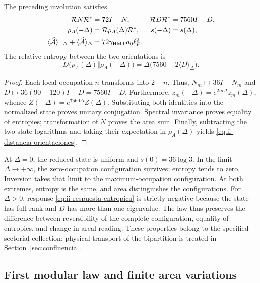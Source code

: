 \begin{theorem}
The preceding involution satisfies
\begin{align}
 \mathcal R N\mathcal R^*&=72I-N,&
 \mathcal R D\mathcal R^*&=7560I-D,\\
 \rho_A(-\Delta)&=\mathcal R\rho_A(\Delta)\mathcal R^*,&
 s(-\Delta)&=s(\Delta),
 \label{eq:ii-inversion-entropia}\\
 \langle\widehat{\mathcal A}\rangle_{-\Delta}
 +\langle\widehat{\mathcal A}\rangle_\Delta
 &=72\gamma_{\mathrm{HMT}}a_0\ell_P^2.&&
 \label{eq:ii-area-complementaria}
\end{align}
The relative entropy between the two orientations is
\begin{equation}
 D\bigl(\rho_A(\Delta)\Vert\rho_A(-\Delta)\bigr)
 =\Delta\bigl(7560-2\langle D\rangle_\Delta\bigr).
 \label{eq:ii-distancia-orientaciones}
\end{equation}
\end{theorem}
\begin{proof}
Each local occupation $n$ transforms into $2-n$. Thus,
$N_m\mapsto36I-N_m$ and
$D\mapsto36(90+120)I-D=7560I-D$.
Furthermore, $z_m(-\Delta)=e^{2m\Delta}z_m(\Delta)$,
whence $Z(-\Delta)=e^{7560\Delta}Z(\Delta)$.
Substituting both identities into the normalized state proves
unitary conjugation. Spectral invariance proves equality
of entropies; transformation of $N$ proves the area sum.
Finally, subtracting the two state logarithms and taking
their expectation in $\rho_A(\Delta)$ yields
\eqref{eq:ii-distancia-orientaciones}.
\end{proof}

At $\Delta=0$, the reduced state is uniform and
$s(0)=36\log3$. In the limit $\Delta\to+\infty$, the zero-occupation
configuration survives; entropy tends to zero.
Inversion takes that limit to the maximum-occupation configuration.
At both extremes, entropy is the same, and area distinguishes the
configurations. For $\Delta>0$, response
\eqref{eq:ii-respuesta-entropica} is strictly negative because
the state has full rank and $D$ has more than one eigenvalue.
The law thus preserves the difference between reversibility of the
complete configuration, equality of entropies, and change in areal reading.
These properties belong to the specified sectorial collection;
physical transport of the bipartition is treated in
Section~\ref{sec:confluencia}.

\subsection{First modular law and finite area variations}
\label{sec:ii-area-ley-modular}

